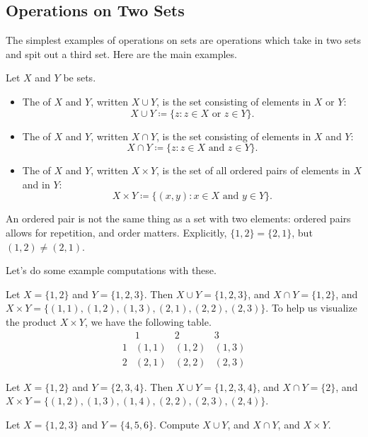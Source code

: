 \documentclass[../notes.tex]{subfiles}
\begin{document}
\subsection{Operations on Two Sets}
The simplest examples of operations on sets are operations which take in two sets and spit out a third set. Here are the main examples.
\begin{definition}
    Let $X$ and $Y$ be sets.
    \begin{itemize}
        \item The  of $X$ and $Y$, written $X \cup Y$, is the set consisting of elements in $X$ or $Y$:
        \[X \cup Y \coloneqq \{z: z \in X \text{ or } z \in Y\}.\]
        \item The  of $X$ and $Y$, written $X \cap Y$, is the set consisting of elements in $X$ and $Y$:
        \[X \cap Y \coloneqq \{z: z \in X \text{ and } z \in Y\}.\]
        \item The  of $X$ and $Y$, written $X \times Y$, is the set of all ordered pairs of elements in $X$ and in $Y$:
        \[X \times Y \coloneqq \{(x, y): x \in X \text { and } y \in Y\}.\]
    \end{itemize}
\end{definition}
\begin{remark}
    An ordered pair is not the same thing as a set with two elements: ordered pairs allows for repetition, and order matters. Explicitly, $\{1,2\}=\{2,1\}$, but $(1,2)\ne(2,1)$.
\end{remark}
Let's do some example computations with these.
\begin{example}
    Let $X=\{1,2\}$ and $Y=\{1,2,3\}$. Then $X\cup Y=\{1,2,3\}$, and $X\cap Y=\{1,2\}$, and $X\times Y=\{(1,1),(1,2),(1,3),(2,1),(2,2),(2,3)\}$. To help us visualize the product $X\times Y$, we have the following table.
    \[\begin{array}{c|ccc}
          &     1 &     2 &     3 \\\hline
        1 & (1,1) & (1,2) & (1,3) \\
        2 & (2,1) & (2,2) & (2,3)
    \end{array}\]
\end{example}
\begin{example}
    Let $X=\{1,2\}$ and $Y=\{2,3,4\}$. Then $X\cup Y=\{1,2,3,4\}$, and $X\cap Y=\{2\}$, and $X\times Y=\{(1,2),(1,3),(1,4),(2,2),(2,3),(2,4)\}$.
\end{example}
\begin{exercise}
    Let $X=\{1,2,3\}$ and $Y=\{4,5,6\}$. Compute $X\cup Y$, and $X\cap Y$, and $X\times Y$.
\end{exercise}
\end{document}
